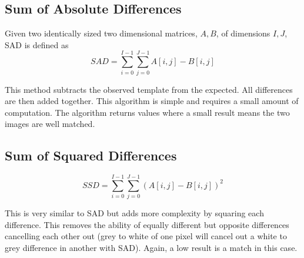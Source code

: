 \subsection{Sum of Absolute Differences}\label{Section:SAD}

Given two identically sized two dimensional matrices, $A, B$, of dimensions $I,J$, SAD is defined as
\begin{equation} \label{eq:SAD}
SAD = \sum\limits_{i=0}^{I-1} \sum\limits_{j=0}^{J-1} A[i,j] - B[i,j] 
\end{equation}

This method subtracts the observed template from the expected. All differences are then added together. This algorithm is simple and requires a small amount of computation. The algorithm returns values where a small result means the two images are well matched.

\subsection{Sum of Squared Differences}\label{Section:SSD}
\begin{equation}\label{eq:SSD}
SSD = \sum\limits_{i=0}^{I-1} \sum\limits_{j=0}^{J-1} (A[i,j] - B[i,j] )^2
\end{equation}

This is very similar to SAD but adds more complexity by squaring each difference. This removes the ability of equally different but opposite differences cancelling each other out (grey to white of one pixel will cancel out a white to grey difference in another with SAD). Again, a low result is a match in this case.

%



